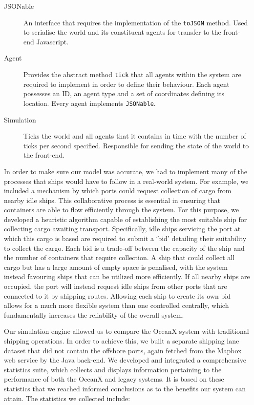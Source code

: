 \begin{description}
	\item[JSONable] An interface that requires the implementation of the \texttt{toJSON} method. Used to serialise the world and its constituent agents for transfer to the front-end Javascript.
	\item[Agent] Provides the abstract method \lstinline{tick} that all agents within the system are required to implement in order to define their behaviour. Each agent possesses an ID, an agent type and a set of coordinates defining its location. Every agent implements \lstinline{JSONable}.
	\item[Simulation] Ticks the world and all agents that it contains in time with the number of ticks per second specified. Responsible for sending the state of the world to the front-end.
\end{description}

In order to make sure our model was accurate, we had to implement many of the processes that ships would have to follow in a real-world system. For example, we included a mechanism by which ports could request collection of cargo from nearby idle ships. This collaborative process is essential in ensuring that containers are able to flow efficiently through the system. For this purpose, we developed a heuristic algorithm capable of establishing the most suitable ship for collecting cargo awaiting transport. Specifically, idle ships servicing the port at which this cargo is based are required to submit a `bid’ detailing their suitability to collect the cargo. Each bid is a trade-off between the capacity of the ship and the number of containers that require collection. A ship that could collect all cargo but has a large amount of empty space is penalised, with the system instead favouring ships that can be utilized more efficiently. If all nearby ships are occupied, the port will instead request idle ships from other ports that are connected to it by shipping routes. Allowing each ship to create its own bid allows for a much more flexible system than one controlled centrally, which fundamentally increases the reliability of the overall system.

Our simulation engine allowed us to compare the OceanX system with traditional shipping operations. In order to achieve this, we built a separate shipping lane dataset that did not contain the offshore ports, again fetched from the Mapbox web service by the Java back-end. We developed and integrated a comprehensive statistics suite, which collects and displays information pertaining to the performance of both the OceanX and legacy systems. It is based on these statistics that we reached informed conclusions as to the benefits our system can attain. The statistics we collected include:

